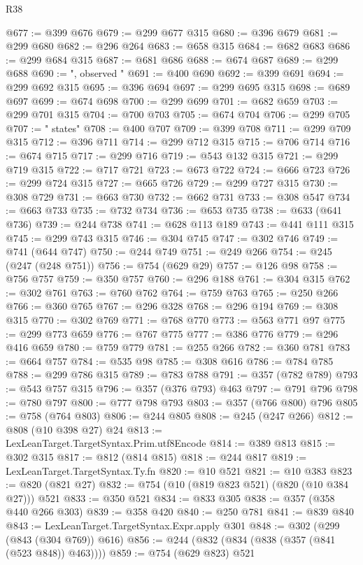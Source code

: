 \begin{lexlean}{R38}
\begin{coremodule}
@677 := @399 @676
@679 := @299 @677 @315
@680 := @396 @679
@681 := @299 @680
@682 := @296 @264
@683 := @658 @315
@684 := @682 @683
@686 := @299 @684 @315
@687 := @681 @686
@688 := @674 @687
@689 := @299 @688
@690 := ", observed "
@691 := @400 @690
@692 := @399 @691
@694 := @299 @692 @315
@695 := @396 @694
@697 := @299 @695 @315
@698 := @689 @697
@699 := @674 @698
@700 := @299 @699
@701 := @682 @659
@703 := @299 @701 @315
@704 := @700 @703
@705 := @674 @704
@706 := @299 @705
@707 := " states"
@708 := @400 @707
@709 := @399 @708
@711 := @299 @709 @315
@712 := @396 @711
@714 := @299 @712 @315
@715 := @706 @714
@716 := @674 @715
@717 := @299 @716
@719 := @543 @132 @315
@721 := @299 @719 @315
@722 := @717 @721
@723 := @673 @722
@724 := @666 @723
@726 := @299 @724 @315
@727 := @665 @726
@729 := @299 @727 @315
@730 := @308 @729
@731 := @663 @730
@732 := @662 @731
@733 := @308 @547
@734 := @663 @733
@735 := @732 @734
@736 := @653 @735
@738 := @633 (@641 @736)
@739 := @244 @738
@741 := @628 @113 @189
@743 := @441 @111 @315
@745 := @299 @743 @315
@746 := @304 @745
@747 := @302 @746
@749 := @741 (@644 @747)
@750 := @244 @749
@751 := @249 @266
@754 := @245 (@247 (@248 @751))
@756 := @754 (@629 @29)
@757 := @126 @98
@758 := @756 @757
@759 := @350 @757
@760 := @296 @188
@761 := @304 @315
@762 := @302 @761
@763 := @760 @762
@764 := @759 @763
@765 := @250 @266
@766 := @360 @765
@767 := @296 @328
@768 := @296 @194
@769 := @308 @315
@770 := @302 @769
@771 := @768 @770
@773 := @563 @771 @97
@775 := @299 @773 @659
@776 := @767 @775
@777 := @386 @776
@779 := @296 @416 @659
@780 := @759 @779
@781 := @255 @266
@782 := @360 @781
@783 := @664 @757
@784 := @535 @98
@785 := @308 @616
@786 := @784 @785
@788 := @299 @786 @315
@789 := @783 @788
@791 := @357 (@782 @789)
@793 := @543 @757 @315
@796 := @357 (@376 @793) @463
@797 := @791 @796
@798 := @780 @797
@800 := @777 @798 @793
@803 := @357 (@766 @800) @796
@805 := @758 (@764 @803)
@806 := @244 @805
@808 := @245 (@247 @266)
@812 := @808 (@10 @398 @27) @24
@813 := LexLeanTarget.TargetSyntax.Prim.utf8Encode
@814 := @389 @813
@815 := @302 @315
@817 := @812 (@814 @815)
@818 := @244 @817
@819 := LexLeanTarget.TargetSyntax.Ty.fn
@820 := @10 @521
@821 := @10 @383
@823 := @820 (@821 @27)
@832 := @754 (@10 (@819 @823 @521) (@820 (@10 @384 @27))) @521
@833 := @350 @521
@834 := @833 @305
@838 := @357 (@358 @440 @266 @303)
@839 := @358 @420
@840 := @250 @781
@841 := @839 @840
@843 := LexLeanTarget.TargetSyntax.Expr.apply @301
@848 := @302 (@299 (@843 (@304 @769)) @616)
@856 := @244 (@832 (@834 (@838 (@357 (@841 (@523 @848)) @463))))
@859 := @754 (@629 @823) @521

\end{coremodule}
\end{lexlean}
